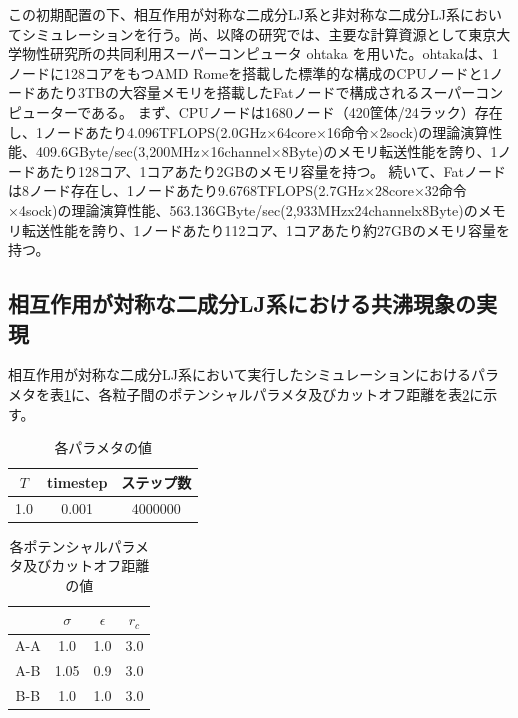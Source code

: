 \documentclass[titlepage]{jsreport}
\begin{document}
この初期配置の下、相互作用が対称な二成分LJ系と非対称な二成分LJ系においてシミュレーションを行う。尚、以降の研究では、主要な計算資源として東京大学物性研究所の共同利用スーパーコンピュータ ohtaka を用いた。ohtakaは、1ノードに128コアをもつAMD Romeを搭載した標準的な構成のCPUノードと1ノードあたり3TBの大容量メモリを搭載したFatノードで構成されるスーパーコンピューターである\cite{ohtaka}。
まず、CPUノードは1680ノード（420筐体/24ラック）存在し、1ノードあたり4.096TFLOPS(2.0GHz×64core×16命令×2sock)の理論演算性能、409.6GByte/sec(3,200MHz×16channel×8Byte)のメモリ転送性能を誇り、1ノードあたり128コア、1コアあたり2GBのメモリ容量を持つ。
続いて、Fatノードは8ノード存在し、1ノードあたり9.6768TFLOPS(2.7GHz×28core×32命令×4sock)の理論演算性能、563.136GByte/sec(2,933MHzx24channelx8Byte)のメモリ転送性能を誇り、1ノードあたり112コア、1コアあたり約27GBのメモリ容量を持つ。

\subsection{相互作用が対称な二成分LJ系における共沸現象の実現} \label{method-subsec:bi-symmetric-component-azeotrope}
相互作用が対称な二成分LJ系において実行したシミュレーションにおけるパラメタを表\ref{table:symmetric-bi-component-azeotrope-parameter}に、各粒子間のポテンシャルパラメタ及びカットオフ距離を表\ref{table:symmetric-bi-component-azeotrope-potential-parameter}に示す。

\begin{table}[htbp]
    \begin{center}
        \caption{各パラメタの値}
        \label{table:symmetric-bi-component-azeotrope-parameter}
            \begin{tabular}{c c c}
                $T$ & timestep & ステップ数 \\
                \hline
                1.0 & 0.001 & 4000000 \\
            \end{tabular}
    \end{center}
\end{table}

\begin{table}[htbp]
    \begin{center}
        \caption{各ポテンシャルパラメタ及びカットオフ距離の値}
        \label{table:symmetric-bi-component-azeotrope-potential-parameter}
            \begin{tabular}{c c c c}
                & $\sigma$ & $\epsilon$ & $r_c$ \\
                \hline
                A-A & 1.0 & 1.0 & 3.0 \\
                A-B & 1.05 & 0.9 & 3.0 \\
                B-B & 1.0 & 1.0 & 3.0
            \end{tabular}
    \end{center}
\end{table}
\end{document}
